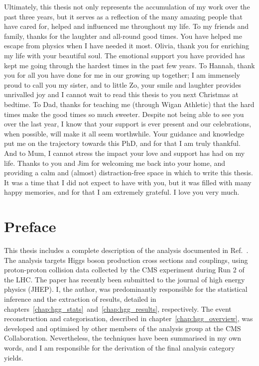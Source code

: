 Ultimately, this thesis not only represents the accumulation of my work over the past three years, but it serves as a reflection of the many amazing people that have cared for, helped and influenced me throughout my life. To my friends and family, thanks for the laughter and all-round good times. You have helped me escape from physics when I have needed it most. Olivia, thank you for enriching my life with your beautiful soul. The emotional support you have provided has kept me going through the hardest times in the past few years. To Hannah, thank you for all you have done for me in our growing up together; I am immensely proud to call you my sister, and to little Zo, your smile and laughter provides unrivalled joy and I cannot wait to read this thesis to you next Christmas at bedtime. To Dad, thanks for teaching me (through Wigan Athletic) that the hard times make the good times so much sweeter. Despite not being able to see you over the last year, I know that your support is ever present and our celebrations, when possible, will make it all seem worthwhile. Your guidance and knowledge put me on the trajectory towards this PhD, and for that I am truly thankful. And to Mum, I cannot stress the impact your love and support has had on my life. Thanks to you and Jim for welcoming me back into your home, and providing a calm and (almost) distraction-free space in which to write this thesis. It was a time that I did not expect to have with you, but it was filled with many happy memories, and for that I am extremely grateful. I love you very much.

\tableofcontents
\listoffigures
\listoftables

\chapter*{\centering Preface}
This thesis includes a complete description of the \Hgg analysis documented in Ref.~\cite{Sirunyan:2021ybb}. The analysis targets Higgs boson production cross sections and couplings, using proton-proton collision data collected by the CMS experiment during Run 2 of the LHC. The paper has recently been submitted to the journal of high energy physics (JHEP). I, the author, was predominantly responsible for the statistical inference and the extraction of results, detailed in chapters~\ref{chap:hgg_stats}~and~\ref{chap:hgg_results}, respectively. The event reconstruction and categorisation, described in chapter~\ref{chap:hgg_overview}, was developed and optimised by other members of the \Hgg analysis group at the CMS Collaboration. Nevertheless, the techniques have been summarised in my own words, and I am responsible for the derivation of the final analysis category yields.

